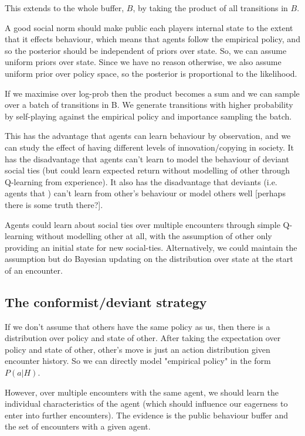 \documentclass[a4paper]{report}
\begin{document}
This extends to the whole buffer, $B$, by taking the product of all transitions in $B$.

A good social norm should make public each players internal state to the extent that it effects behaviour, which means that agents follow the empirical policy, and so the posterior should be independent of priors over state. So, we can assume uniform priors over state. Since we have no reason otherwise, we also assume uniform prior over policy space, so the posterior is proportional to the likelihood. 

If we maximise over log-prob then the product becomes a sum and we can sample over a batch of transitions in B. We generate transitions with higher probability by self-playing against the empirical policy and importance sampling the batch.
 
This has the advantage that agents can learn behaviour by observation, and we can study the effect of having different levels of innovation/copying in society. It has the disadvantage that agents can't learn to model the behaviour of deviant social ties (but could learn expected return without modelling of other through Q-learning from experience). It also has the disadvantage that deviants (i.e. agents that ) can't learn from other's behaviour or model others well [perhaps there is some truth there?].

Agents could learn about social ties over multiple encounters through simple Q-learning without modelling other at all, with the assumption of other only providing an initial state for new social-ties. Alternatively, we could maintain the assumption but do Bayesian updating on the distribution over state at the start of an encounter.



\subsection{The conformist/deviant strategy}

If we don't assume that others have the same policy as us, then there is a distribution over policy and state of other. After taking the expectation over policy and state of other, other's move is just an action distribution given encounter history. So we can directly model "empirical policy" in the form $P(a|H)$.

However, over multiple encounters with the same agent, we should learn the individual characteristics of the agent (which should influence our eagerness to enter into further encounters). The evidence is the public behaviour buffer and the set of encounters with a given agent.
\end{document}

